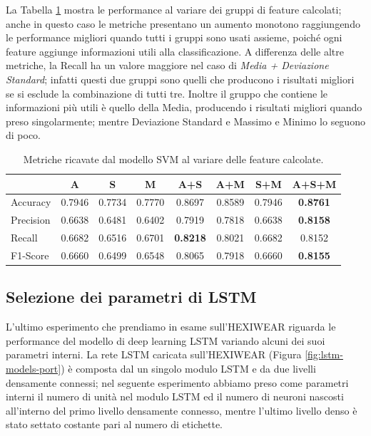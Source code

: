 La Tabella \ref{tab:metrics-svm-feat-hexi} mostra le performance al variare dei gruppi di feature calcolati; anche in questo caso le metriche presentano un aumento monotono raggiungendo le performance migliori quando tutti i gruppi sono usati assieme, poiché ogni feature aggiunge informazioni utili alla classificazione. A differenza delle altre metriche, la Recall ha un valore maggiore nel caso di \textit{Media + Deviazione Standard}; infatti questi due gruppi sono quelli che producono i risultati migliori se si esclude la combinazione di tutti tre. Inoltre il gruppo che contiene le informazioni più utili è quello della Media, producendo i risultati migliori quando preso singolarmente; mentre Deviazione Standard e Massimo e Minimo lo seguono di poco.

\begin{table}
    \centering
    \begin{tabular}{l c c c c c c c}
        \hline
        & A & S & M & A+S & A+M & S+M & A+S+M \\
        \hline
        Accuracy & 0.7946 & 0.7734 & 0.7770 & 0.8697 & 0.8589 & 0.7946 & \textbf{0.8761} \\
        Precision & 0.6638 & 0.6481 & 0.6402 & 0.7919 & 0.7818 & 0.6638 & \textbf{0.8158} \\
        Recall & 0.6682 & 0.6516 & 0.6701 & \textbf{0.8218} & 0.8021 & 0.6682 & 0.8152 \\
        F1-Score & 0.6660 & 0.6499 & 0.6548 & 0.8065 & 0.7918 & 0.6660 & \textbf{0.8155} \\
        \hline
    \end{tabular}
    \caption{Metriche ricavate dal modello SVM al variare delle feature calcolate.}
    \label{tab:metrics-svm-feat-hexi}
\end{table}

\subsection{Selezione dei parametri di LSTM}
\label{ssec:selezione-dei-parametri-di-lstm-hexi}

L'ultimo esperimento che prendiamo in esame sull'HEXIWEAR riguarda le performance del modello di deep learning LSTM variando alcuni dei suoi parametri interni. 
La rete LSTM caricata sull'HEXIWEAR (Figura \ref{fig:lstm-models-port}) è composta dal un singolo modulo LSTM e da due livelli densamente connessi; nel seguente esperimento abbiamo preso come parametri interni il numero di unità nel modulo LSTM ed il numero di neuroni nascosti all'interno del primo livello densamente connesso, mentre l'ultimo livello denso è stato settato costante pari al numero di etichette. 

